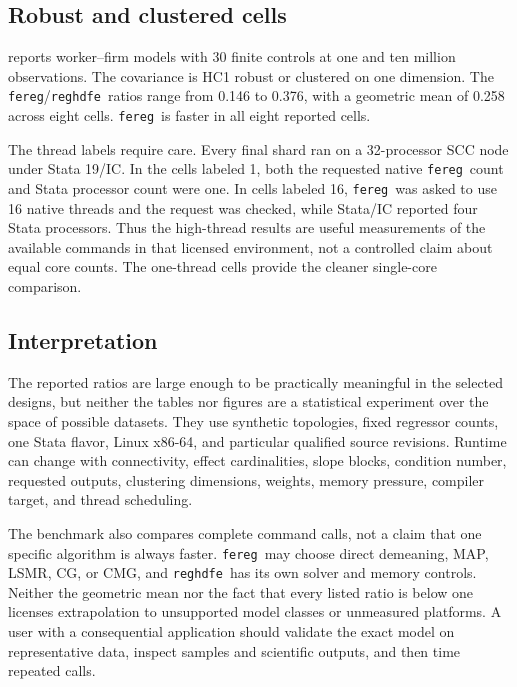 \documentclass[11pt]{article}
\newcommand{\fereg}{\texttt{fereg}}
\newcommand{\reghdfe}{\texttt{reghdfe}}
\begin{document}
\subsection{Robust and clustered cells}



 reports worker--firm models with 30 finite controls at one
and ten million observations.  The covariance is HC1 robust or clustered on
one dimension.  The \fereg/\reghdfe\ ratios range from 0.146 to 0.376, with a
geometric mean of 0.258 across eight cells.  \fereg\ is faster in all eight
reported cells.

The thread labels require care.  Every final shard ran on a 32-processor SCC
node under Stata 19/IC.  In the cells labeled 1, both the requested native
\fereg\ count and Stata processor count were one.  In cells labeled 16,
\fereg\ was asked to use 16 native threads and the request was checked, while
Stata/IC reported four Stata processors.  Thus the high-thread results are
useful measurements of the available commands in that licensed environment,
not a controlled claim about equal core counts.  The one-thread cells provide
the cleaner single-core comparison.

\subsection{Interpretation}

The reported ratios are large enough to be practically meaningful in the
selected designs, but neither the tables nor figures are a statistical experiment over the
space of possible datasets.  They use synthetic topologies, fixed regressor
counts, one Stata flavor, Linux x86-64, and particular qualified source
revisions.  Runtime can change with connectivity, effect cardinalities,
slope blocks, condition number, requested outputs, clustering dimensions,
weights, memory pressure, compiler target, and thread scheduling.

The benchmark also compares complete command calls, not a claim that one
specific algorithm is always faster.  \fereg\ may choose direct demeaning,
MAP, LSMR, CG, or CMG, and \reghdfe\ has its own solver and memory controls.
Neither the geometric mean nor the fact that every listed ratio is below one
licenses extrapolation to unsupported model classes or unmeasured platforms.
A user with a consequential application should validate the exact model on
representative data, inspect samples and scientific outputs, and then time
repeated calls.
\end{document}
